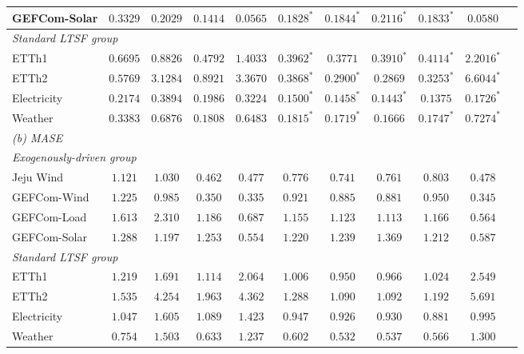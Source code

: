 \begin{table}[t]
\begin{tabular}{lcccccccccc}
GEFCom-Solar  & $0.3329$ & $0.2029$ & $0.1414$ & $\mathbf{0.0565}$ & $0.1828^{*}$ & $0.1844^{*}$ & $0.2116^{*}$ & $0.1833^{*}$ & $0.0580$ \\
\midrule
\multicolumn{10}{l}{\emph{Standard LTSF group}} \\
ETTh1         & $0.6695$ & $0.8826$ & $0.4792$ & $1.4033$ & $0.3962^{*}$ & $\mathbf{0.3771}$ & $0.3910^{*}$ & $0.4114^{*}$ & $2.2016^{*}$ \\
ETTh2         & $0.5769$ & $3.1284$ & $0.8921$ & $3.3670$ & $0.3868^{*}$ & $0.2900^{*}$ & $\mathbf{0.2869}$ & $0.3253^{*}$ & $6.6044^{*}$ \\
Electricity   & $0.2174$ & $0.3894$ & $0.1986$ & $0.3224$ & $0.1500^{*}$ & $0.1458^{*}$ & $0.1443^{*}$ & $\mathbf{0.1375}$ & $0.1726^{*}$ \\
Weather       & $0.3383$ & $0.6876$ & $0.1808$ & $0.6483$ & $0.1815^{*}$ & $0.1719^{*}$ & $\mathbf{0.1666}$ & $0.1747^{*}$ & $0.7274^{*}$ \\
\midrule
\multicolumn{10}{l}{\emph{(b) MASE}} \\[2pt]
\multicolumn{10}{l}{\emph{Exogenously-driven group}} \\
Jeju Wind     & $1.121$ & $1.030$ & $\mathbf{0.462}$ & $0.477$ & $0.776$ & $0.741$ & $0.761$ & $0.803$ & $0.478$ \\
GEFCom-Wind   & $1.225$ & $0.985$ & $0.350$ & $\mathbf{0.335}$ & $0.921$ & $0.885$ & $0.881$ & $0.950$ & $0.345$ \\
GEFCom-Load   & $1.613$ & $2.310$ & $1.186$ & $0.687$ & $1.155$ & $1.123$ & $1.113$ & $1.166$ & $\mathbf{0.564}$ \\
GEFCom-Solar  & $1.288$ & $1.197$ & $1.253$ & $\mathbf{0.554}$ & $1.220$ & $1.239$ & $1.369$ & $1.212$ & $0.587$ \\
\midrule
\multicolumn{10}{l}{\emph{Standard LTSF group}} \\
ETTh1         & $1.219$ & $1.691$ & $1.114$ & $2.064$ & $1.006$ & $\mathbf{0.950}$ & $0.966$ & $1.024$ & $2.549$ \\
ETTh2         & $1.535$ & $4.254$ & $1.963$ & $4.362$ & $1.288$ & $\mathbf{1.090}$ & $1.092$ & $1.192$ & $5.691$ \\
Electricity   & $1.047$ & $1.605$ & $1.089$ & $1.423$ & $0.947$ & $0.926$ & $0.930$ & $\mathbf{0.881}$ & $0.995$ \\
Weather       & $0.754$ & $1.503$ & $0.633$ & $1.237$ & $0.602$ & $\mathbf{0.532}$ & $0.537$ & $0.566$ & $1.300$ \\
\bottomrule
\end{tabular}
\end{table}

